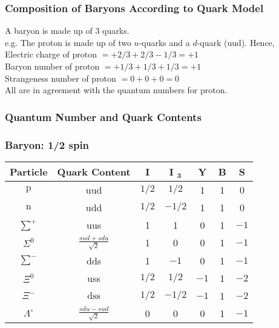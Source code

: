 \subsubsection{Composition of Baryons According to Quark Model}
A baryon is made up of 3 quarks.\\
e.g. The proton is made up of two $u$-quarks and a $d$-quark (uud). Hence,\\ Electric charge of proton $=+2 / 3+2 / 3-1 / 3=+1$\\
Baryon number of proton $=+1 / 3+1 / 3+1 / 3=+1$\\
Strangeness number of proton $=0+0+0=0$\\
All are in agreement with the quantum numbers for proton.
\subsubsection{Quantum Number and Quark Contents}
\subsubsection{Baryon: 1/2 spin}
\renewcommand*{\arraystretch}{1.5}
\begin{tabular}{|c|c|c|c|c|c|c|}
	\hline Particle & Quark Content & I & I $_{\mathbf{3}}$ & Y & B & S \\
	\hline $\mathrm{p}$ & uud & $1 / 2$ & $1 / 2$ & 1 & 1 & 0 \\
	\hline $\mathrm{n}$ & udd & $1 / 2$ & $-1 / 2$ & 1 & 1 & 0 \\
	\hline $\sum^{+}$ & uus & 1 & 1 & 0 & 1 & $-1$\\
	\hline $\Sigma^0$ & $\frac{s u d+s d u}{\sqrt{2}}$ & 1 & 0 & 0 & 1 & $-1$ \\
	\hline $\sum^{-}$ & dds & 1 & $-1$ & 0 & 1 & $-1$ \\
	\hline $\Xi^0$ & uss & $1 / 2$ & $1 / 2$ & $-1$ & 1 & $-2$ \\
	\hline $\Xi^{-}$ & $\mathrm{dss}$ & $1 / 2$ & $-1 / 2$ & $-1$ & 1 & $-2$ \\
	\hline $\Lambda^{\circ}$ & $\frac{s d u-s u d}{\sqrt{2}}$ & 0 & 0 & 0 & 1 & $-1$ \\
	\hline
\end{tabular}
